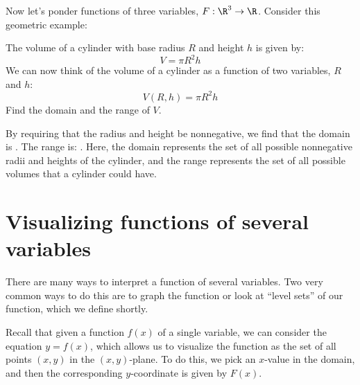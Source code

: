 \documentclass{ximera}
\begin{document}
Now let's ponder functions of three variables, $F:\R^3\to\R$. Consider
this geometric example:
\begin{example}
  The volume of a cylinder with base radius $R$ and height $h$ is
  given by:
  \[
  V=\pi R^2h
  \]
  We can now think of the volume of a cylinder as a function of two
  variables, $R$ and $h$:
  \[
  V(R,h) = \pi R^2h
  \]
  Find the domain and the range of $V$.
  \begin{explanation}
    By requiring that the radius and height be nonnegative, we find that the domain is
    \wordChoice{
      \choice{$\R$}
      \choice{$[0,\infty)$}
      \choice[correct]{$\{ (R,h) \in \R^2 : R \geq 0, h \geq 0\}$}
      }. 
The range is:
\wordChoice{
  \choice{$\R$}
  \choice[correct]{$[0,\infty)$}
  \choice{$\{ (R,h) \in \R^2 : R \geq 0, h \geq 0\}$}
  }.
Here, the domain represents the set of all possible nonnegative radii and heights of the cylinder, and the range represents the set of all possible volumes that a cylinder could have.
  \end{explanation}
\end{example}




\section{Visualizing functions of several variables}

There are many ways to interpret a function of several variables.  Two
very common ways to do this are to graph the function or look at
``level sets'' of our function, which we define shortly.

Recall that given a function $f(x)$ of a single variable, we can
consider the equation $y=f(x)$, which allows us to visualize the
function as the set of all points $(x,y)$ in the $(x,y)$-plane.  To do
this, we pick an $x$-value in the domain, and then the corresponding
$y$-coordinate is given by $F(x)$.

\end{document}
